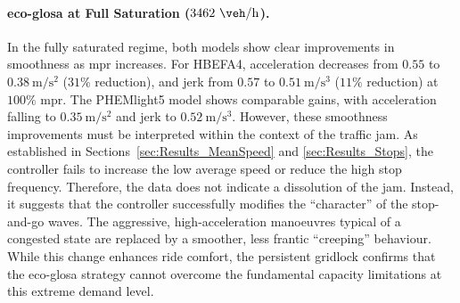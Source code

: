 \paragraph{\ac{eco-glosa} at Full Saturation ($3462~\unit{\veh\per\hour}$).}
In the fully saturated regime, both models show clear improvements in smoothness as \ac{mpr} increases. For HBEFA4, acceleration decreases from $0.55$ to $0.38~\unit{\metre\per\second\squared}$ ($31\%$ reduction), and jerk from $0.57$ to $0.51~\unit{\metre\per\second\cubed}$ ($11\%$ reduction) at $100\%$ \ac{mpr}. The PHEMlight5 model shows comparable gains, with acceleration falling to $0.35~\unit{\metre\per\second\squared}$ and jerk to $0.52~\unit{\metre\per\second\cubed}$. However, these smoothness improvements must be interpreted within the context of the traffic jam. As established in Sections~\vref{sec:Results_MeanSpeed} and \vref{sec:Results_Stops}, the controller fails to increase the low average speed or reduce the high stop frequency. Therefore, the data does not indicate a dissolution of the jam. Instead, it suggests that the controller successfully modifies the \enquote{character} of the stop-and-go waves. The aggressive, high-acceleration manoeuvres typical of a congested state are replaced by a smoother, less frantic \enquote{creeping} behaviour. While this change enhances ride comfort, the persistent gridlock confirms that the \ac{eco-glosa} strategy cannot overcome the fundamental capacity limitations at this extreme demand level.

